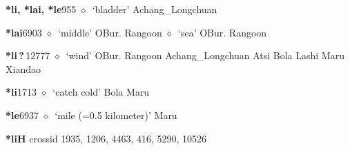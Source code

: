   \begin{list}{}{\leftmargin=1.5em \itemindent=-1.5em}
  \item {\footnotesize \textbf{*li, *lai, *le}}{\tiny 955}
         $\diamond$~`bladder'
         Achang\_Longchuan 
  \item {\footnotesize \textbf{*lai}}{\tiny 6903}
\hspace{1ex}
         $\diamond$~`middle'
         OBur. 
\hspace{1ex}
         Rangoon 
\hspace{1ex}
         $\diamond$~`sea'
         OBur. 
\hspace{1ex}
         Rangoon 
  \item {\footnotesize \textbf{*li\,?\,}}{\tiny 12777}
\hspace{1ex}
         $\diamond$~`wind'
         OBur. 
\hspace{1ex}
         Rangoon 
\hspace{1ex}
         Achang\_Longchuan 
\hspace{1ex}
         Atsi 
\hspace{1ex}
         Bola 
\hspace{1ex}
         Lashi 
\hspace{1ex}
         Maru 
\hspace{1ex}
         Xiandao 
  \item {\footnotesize \textbf{*li}}{\tiny 1713}
\hspace{1ex}
         $\diamond$~`catch cold'
         Bola 
\hspace{1ex}
         Maru 
  \item {\footnotesize \textbf{*le}}{\tiny 6937}
\hspace{1ex}
         $\diamond$~`mile (=0.5 kilometer)'
         Maru 
  \end{list}
\item
\textbf{*liH}
  {\tiny crossid 1935, 1206, 4463, 416, 5290, 10526}

